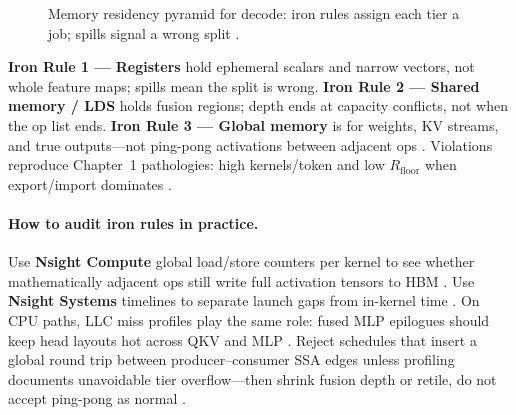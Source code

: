 \begin{figure}[t]
\centering
{}
\caption{Memory residency pyramid for decode: iron rules assign each tier a job; spills signal a wrong split \citep{yirage2026,dlbook}.}
\label{fig:memory_pyramid}
\end{figure}

\textbf{Iron Rule 1 --- Registers} hold ephemeral scalars and narrow vectors, not whole feature maps; spills mean the split is wrong.
\textbf{Iron Rule 2 --- Shared memory / LDS} holds fusion regions; depth ends at capacity conflicts, not when the op list ends.
\textbf{Iron Rule 3 --- Global memory} is for weights, KV streams, and true outputs---not ping-pong activations between adjacent ops \citep{yirage2026}.
Violations reproduce Chapter~1 pathologies: high kernels/token and low $R_{\mathrm{floor}}$ when export/import dominates \citep{memoryfloor2026}.

\paragraph{How to audit iron rules in practice.}
Use \textbf{Nsight Compute} global load/store counters per kernel to see whether mathematically adjacent ops still write full activation tensors to HBM \citep{nvidia2022hopper}.
Use \textbf{Nsight Systems} timelines to separate launch gaps from in-kernel time \citep{taxbreak2026}.
On CPU paths, LLC miss profiles play the same role: fused MLP epilogues should keep head layouts hot across QKV and MLP \citep{patel2025llminference}.
Reject schedules that insert a global round trip between producer--consumer SSA edges unless profiling documents unavoidable tier overflow---then shrink fusion depth or retile, do not accept ping-pong as normal \citep{chen2020compilerbasedhardw}.


